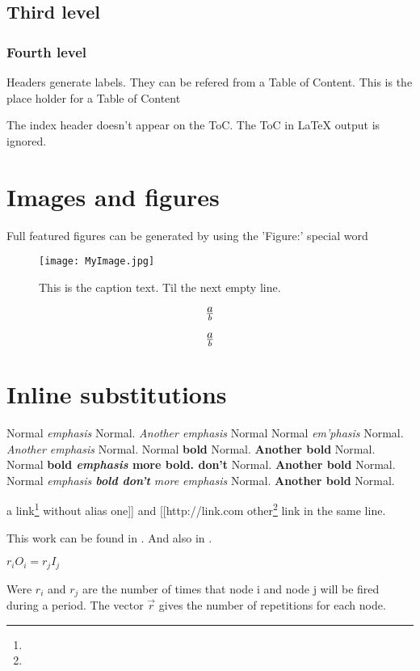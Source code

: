 \subsection{Third level}

\subsubsection{Fourth level}

Headers generate labels.
They can be refered from a Table of Content.
This is the place holder for a Table of Content



The index header doesn't appear on the ToC.
The ToC in LaTeX output is ignored.

\section{Images and figures}
\label{OtherLabel}

Full featured figures can be generated by using the 'Figure:' special word
\begin{figure*}[htbp]
\begin{center}\texttt{[image: MyImage.jpg]}\end{center}
\caption{%
This is the caption text.
Til the next empty line.
}
\label{MyLabel}
\end{figure*}


\[
a\over{b}
\]

\begin{equation}
a\over{b}
\end{equation}


\section{Inline substitutions}

Normal {\em emphasis} Normal. {\em Another emphasis} Normal
Normal {\em em'phasis} Normal. {\em Another emphasis} Normal.
Normal {\bf bold} Normal. {\bf Another bold} Normal.
Normal {\bf bold {\em emphasis} more bold. don't } Normal. {\bf Another bold} Normal.
Normal {\em emphasis {\bf bold don't} more emphasis} Normal. {\bf Another bold} Normal.

a link\footnote{}
 without alias
one]] and [[http://link.com other\footnote{} link in the same line.

This work can be found in \cite{lee87}. And also in \cite{www-CLAM}.


$r_iO_i=r_jI_j$

Were $r_i$ and $r_j$ are the number of times that node i and node j will be fired during a period. The vector $\vec{r}$ gives the number of repetitions for each node.



